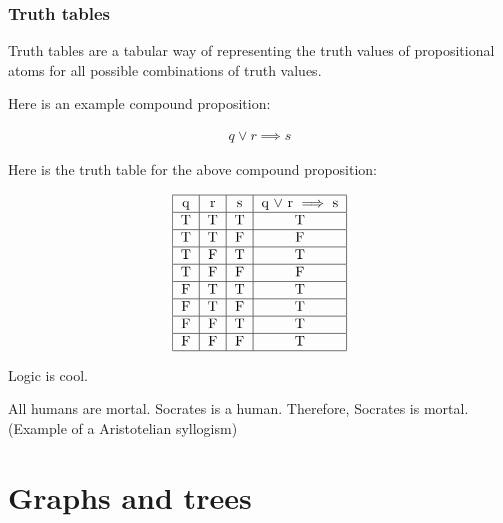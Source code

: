 \documentclass{article}
\begin{document}
\subsubsection{Truth tables}

Truth tables are a tabular way of representing the truth values of propositional atoms for all possible combinations of truth values.

Here is an example compound proposition:

\begin{align*}
    q \lor r \implies s
\end{align*}

Here is the truth table for the above compound proposition:

\begin{align*}
    \begin{tabular}{|c|c|c|c|}
        \hline
        q & r & s & q $\lor$ r $\implies$ s \\
        \hline
        T & T & T & T                       \\
        \hline
        T & T & F & F                       \\
        \hline
        T & F & T & T                       \\
        \hline
        T & F & F & F                       \\
        \hline
        F & T & T & T                       \\
        \hline
        F & T & F & T                       \\
        \hline
        F & F & T & T                       \\
        \hline
        F & F & F & T                       \\
        \hline
    \end{tabular}
\end{align*}

Logic is cool.

All humans are mortal.
Socrates is a human.
Therefore, Socrates is mortal.
(Example of a Aristotelian syllogism)



\section{Graphs and trees}

\end{document}
